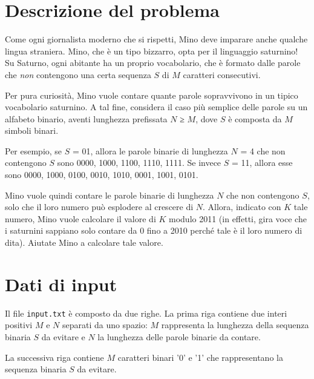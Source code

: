 \documentclass[a4paper,11pt]{article}
\begin{document}
\vspace{0.5cm}



\vspace{0.5cm}

\section*{Descrizione del problema}
   
Come ogni giornalista moderno che si rispetti, Mino deve imparare
anche qualche lingua straniera. Mino, che è un tipo bizzarro,
opta per il linguaggio saturnino!  Su Saturno, ogni abitante ha un
proprio vocabolario, che è formato dalle parole che \emph{non}
contengono una certa sequenza $S$ di $M$ caratteri
consecutivi.

Per pura curiosità, Mino vuole contare quante parole
sopravvivono in un tipico vocabolario saturnino. A tal fine, considera
il caso più semplice delle parole su un alfabeto binario,
aventi lunghezza prefissata $N$ ≥ $M$,
dove $S$ è composta da $M$ simboli binari.

Per esempio, se $S$ = 01, allora le parole binarie di
lunghezza $N$ = 4 che non contengono $S$ sono 0000,
1000, 1100, 1110, 1111. Se invece $S$ = 11, allora esse sono
0000, 1000, 0100, 0010, 1010, 0001, 1001, 0101.

Mino vuole quindi contare le parole binarie di lunghezza $N$
che non contengono $S$, solo che il loro numero può
esplodere al crescere di $N$. Allora, indicato con
$K$ tale numero, Mino vuole calcolare il valore di $K$
modulo 2011 (in effetti, gira voce che i saturnini sappiano solo
contare da 0 fino a 2010 perché tale è il loro numero di
dita). Aiutate Mino a calcolare tale valore.


\section*{Dati di input}
  Il file \texttt{input.txt} è composto da due
righe.
La prima riga contiene due interi positivi $M$ e
$N$ separati da uno spazio: $M$ rappresenta la
lunghezza della sequenza binaria $S$ da evitare e
$N$ la lunghezza delle parole binarie da contare.

La successiva riga contiene $M$ caratteri binari '0' e '1'
che rappresentano la sequenza binaria $S$ da evitare.
\end{document}
